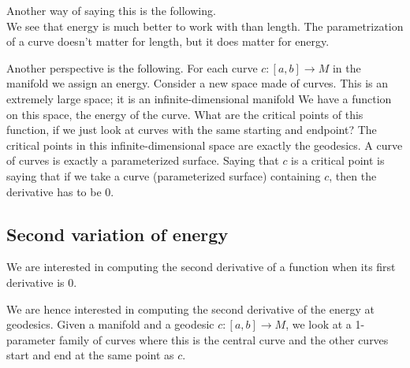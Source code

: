 Another way of saying this is the following. \\

\vspace{0.15in}
We see that energy is much better to work with than length. The parametrization of a curve doesn't matter for length, but it does matter for energy.

Another perspective is the following. 
For each curve $c:[a,b]\to M$ in the manifold we assign an energy. Consider a new space made of curves. This is an extremely large space; it is an infinite-dimensional manifold We have a function on this space, the energy of the curve. What are the critical points of this function, if we just look at curves with the same starting and endpoint? The critical points in this infinite-dimensional space are exactly the geodesics. %
A curve of curves is exactly a parameterized surface. Saying that $c$ is a critical point is saying that if we take a curve (parameterized surface) containing $c$, then the derivative has to be 0. %

\subsection{Second variation of energy}

We are interested in computing the second derivative of a function when its first derivative is 0. 

We are hence interested in computing the second derivative of the energy at geodesics. Given a manifold and a geodesic $c:[a,b]\to M$, we look at a 1-parameter family of curves where this is the central curve and the other curves start and end at the same point as $c$.

